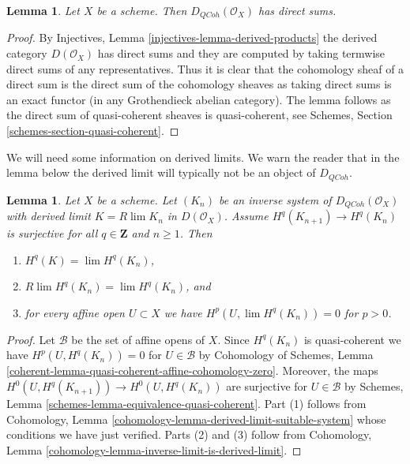 \documentclass{stacks-project}
\theoremstyle{plain}
\newtheorem{lemma}[subsection]{Lemma}
\theoremstyle{definition}
\theoremstyle{remark}
\numberwithin{equation}{subsection}
\def\lim{\mathop{\mathrm{lim}}\nolimits}
\def\QCoh{\mathit{QCoh}}
\begin{document}
\begin{lemma}
\label{lemma-quasi-coherence-direct-sums}
Let $X$ be a scheme. Then $D_\QCoh(\mathcal{O}_X)$
has direct sums.
\end{lemma}

\begin{proof}
By Injectives, Lemma \ref{injectives-lemma-derived-products}
the derived category $D(\mathcal{O}_X)$ has direct sums and
they are computed by taking termwise direct sums of any representatives.
Thus it is clear that the cohomology sheaf of a direct sum is the
direct sum of the cohomology sheaves as taking direct sums is
an exact functor (in any Grothendieck abelian category). The lemma
follows as the direct sum of quasi-coherent sheaves is quasi-coherent, see
Schemes, Section \ref{schemes-section-quasi-coherent}.
\end{proof}

\noindent
We will need some information on derived limits. We warn the reader
that in the lemma below the derived limit will typically not be
an object of $D_\QCoh$.

\begin{lemma}
\label{lemma-Rlim-quasi-coherent}
Let $X$ be a scheme. Let $(K_n)$ be an inverse system of
$D_\QCoh(\mathcal{O}_X)$ with derived limit
$K = R\lim K_n$ in $D(\mathcal{O}_X)$. Assume $H^q(K_{n + 1}) \to H^q(K_n)$
is surjective for all $q \in \mathbf{Z}$ and $n \geq 1$.
Then
\begin{enumerate}
\item $H^q(K) = \lim H^q(K_n)$,
\item $R\lim H^q(K_n) = \lim H^q(K_n)$, and
\item for every affine open $U \subset X$ we have
$H^p(U, \lim H^q(K_n)) = 0$ for $p > 0$.
\end{enumerate}
\end{lemma}

\begin{proof}
Let $\mathcal{B}$ be the set of affine opens of $X$.
Since $H^q(K_n)$ is quasi-coherent we have $H^p(U, H^q(K_n)) = 0$
for $U \in \mathcal{B}$ by Cohomology of Schemes, Lemma
\ref{coherent-lemma-quasi-coherent-affine-cohomology-zero}.
Moreover, the maps $H^0(U, H^q(K_{n + 1})) \to H^0(U, H^q(K_n))$
are surjective for $U \in \mathcal{B}$ by
Schemes, Lemma \ref{schemes-lemma-equivalence-quasi-coherent}.
Part (1) follows from Cohomology, Lemma
\ref{cohomology-lemma-derived-limit-suitable-system}
whose conditions we have just verified.
Parts (2) and (3) follow from
Cohomology, Lemma \ref{cohomology-lemma-inverse-limit-is-derived-limit}.
\end{proof}
\end{document}

